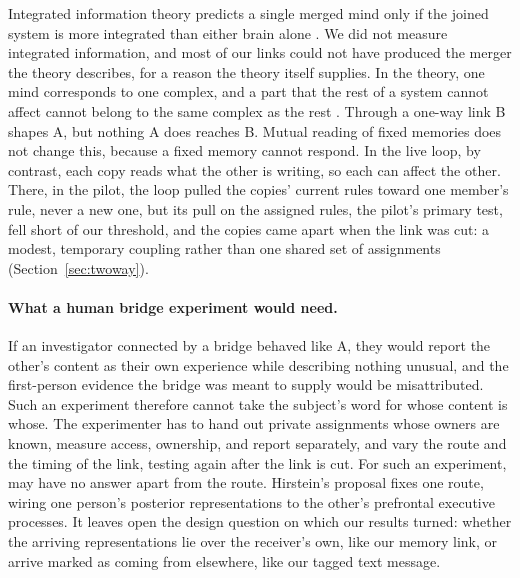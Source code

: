 Integrated information theory predicts a single merged mind only if the
joined system is more integrated than either brain alone
\citep[][note~13]{tononi2015consciousness}. We did not measure
integrated information, and most of our links could not have produced
the merger the theory describes, for a reason the theory itself
supplies. In the theory, one mind corresponds to one complex, and a part
that the rest of a system cannot affect cannot belong to the same
complex as the rest \citep{tononi2015consciousness}. Through a one-way
link B shapes A, but nothing A does reaches B. Mutual reading of fixed
memories does not change this, because a fixed memory cannot respond.
In the live loop, by contrast, each copy reads what the other is
writing, so each can affect the other. There, in the pilot, the loop
pulled the copies' current rules toward one member's rule, never a new
one, but its pull on the assigned rules, the pilot's primary test, fell
short of our threshold, and the copies came apart when the link was cut:
a modest, temporary coupling rather than one shared set of assignments
(Section~\ref{sec:twoway}).

\paragraph{What a human bridge experiment would need.} If an
investigator connected by a bridge behaved like A, they would report the
other's content as their own experience while describing nothing
unusual, and the first-person evidence the bridge was meant to supply
would be misattributed. Such an experiment therefore cannot take the
subject's word for whose content is whose. The experimenter has to hand out private assignments whose owners
are known, measure access, ownership, and report separately, and vary
the route and the timing of the link, testing again after the link is
cut. For such an experiment,  may have no answer apart from the route. Hirstein's proposal
fixes one route, wiring one person's posterior representations to the
other's prefrontal executive processes. It leaves open the design
question on which our results turned: whether the arriving
representations lie over the receiver's own, like our memory link, or
arrive marked as coming from elsewhere, like our tagged text message.

